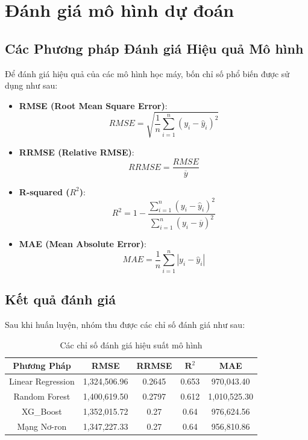 \section{Đánh giá mô hình dự đoán}

\subsection{Các Phương pháp Đánh giá Hiệu quả Mô hình}

Để đánh giá hiệu quả của các mô hình học máy, bốn chỉ số phổ biến được sử dụng như sau:

\begin{itemize}
    \item \textbf{RMSE (Root Mean Square Error)}:
    \[
    RMSE = \sqrt{\frac{1}{n} \sum_{i=1}^{n} (y_i - \hat{y}_i)^2}
    \]

    \item \textbf{RRMSE (Relative RMSE)}:
    \[
    RRMSE = \frac{RMSE}{\overline{y}}
    \]

    \item \textbf{R-squared ($R^2$)}:
    \[
    R^2 = 1 - \frac{\sum_{i=1}^{n}(y_i - \hat{y}_i)^2}{\sum_{i=1}^{n}(y_i - \overline{y})^2}
    \]

    \item \textbf{MAE (Mean Absolute Error)}:
    \[
    MAE = \frac{1}{n} \sum_{i=1}^{n} |y_i - \hat{y}_i|
    \]
\end{itemize}

\subsection{Kết quả đánh giá}

Sau khi huấn luyện, nhóm thu được các chỉ số đánh giá như sau:

\begin{table}[H]
\centering
\caption{Các chỉ số đánh giá hiệu suất mô hình}
\begin{tabular}{|c|c|c|c|c|}
\hline
\textbf{Phương Pháp} & \textbf{RMSE} & \textbf{RRMSE} & \(\mathbf{R}^2\) & \textbf{MAE} \\
\hline
Linear Regression & 1,324,506.96 & 0.2645 & 0.653 & 970,043.40 \\
\hline
Random Forest & 1,400,619.50 & 0.2797 & 0.612 & 1,010,525.30 \\
\hline
XG\_Boost & 1,352,015.72 & 0.27 & 0.64 & 976,624.56 \\
\hline
Mạng Nơ-ron & 1,347,227.33 &0.27 & 0.64 & 956,810.86 \\
\hline
\end{tabular}
\end{table}

